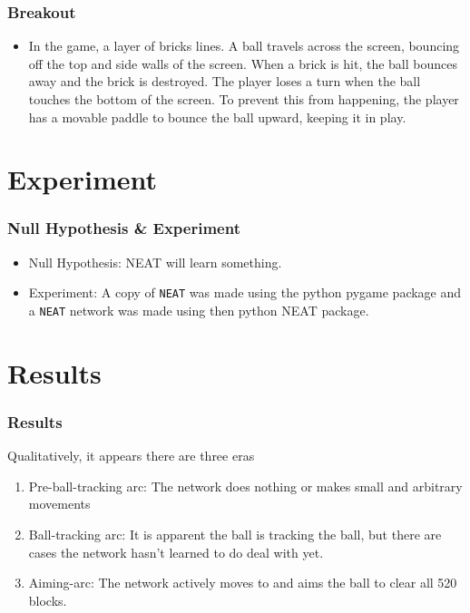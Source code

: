\documentclass[t,pdflatex]{beamer}
\begin{document}
        \begin{frame}

        \frametitle{Breakout}
        \begin{itemize}
            \item In the game, a layer of bricks lines. A ball travels across the screen, bouncing off the top and side walls of the screen. When a brick is hit, the ball bounces away and the brick is destroyed. The player loses a turn when the ball touches the bottom of the screen. To prevent this from happening, the player has a movable paddle to bounce the ball upward, keeping it in play.
        \end{itemize}


    \end{frame}

\section{Experiment}

    \begin{frame}

        \frametitle{Null Hypothesis \& Experiment}
        \begin{itemize}
            \item Null Hypothesis: NEAT will learn something.
            \item Experiment: A copy of \texttt{NEAT} was made using the python pygame package and a \texttt{NEAT} network was made using then python NEAT package.

        \end{itemize}

    \end{frame}

\section{Results}

    \begin{frame}

        \frametitle{Results}
        Qualitatively, it appears there are three eras
        \begin{enumerate}
            \item Pre-ball-tracking arc: The network does nothing or makes small and arbitrary movements
            \item Ball-tracking arc: It is apparent the ball is tracking the ball, but there are cases the network hasn't learned to do deal with yet.
            \item Aiming-arc: The network actively moves to and aims the ball to clear all 520 blocks.
        \end{enumerate}

    \end{frame}
\end{document}
